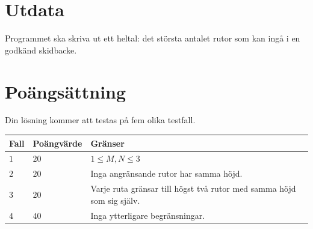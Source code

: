 \section*{Utdata}
Programmet ska skriva ut ett heltal: det största antalet rutor som kan ingå i en godkänd skidbacke.

\section*{Poängsättning}
Din lösning kommer att testas på fem olika testfall.

\noindent
\begin{tabular}{| l | l | l |}
  \hline
  Fall & Poängvärde & Gränser \\ \hline
  $1$    & $20$        &  $1 \leq M, N \leq 3$\\ \hline 
  $2$    & $20$        &  Inga angränsande rutor har samma höjd. \\ \hline 
  $3$    & $20$        &  Varje ruta gränsar till högst två rutor med samma höjd som sig själv. \\ \hline
  $4$    & $40$        &  Inga ytterligare begränsningar. \\ \hline
\end{tabular}

